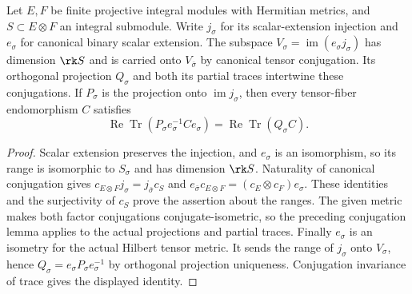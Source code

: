 \begin{lemma}
\label{lem:arithmetic-tensor-projection}
\leanok
Let $E,F$ be finite projective integral modules with Hermitian metrics,
and $S\subset E\otimes F$ an integral submodule. Write $j_\sigma$
for its scalar-extension injection and $e_\sigma$ for canonical binary
scalar extension. The subspace $V_\sigma=\operatorname{im}(e_\sigma j_\sigma)$
has dimension $\rk S$ and is carried onto $V_{\bar\sigma}$ by canonical
tensor conjugation. Its orthogonal projection $Q_\sigma$ and both its
partial traces intertwine these conjugations. If $P_\sigma$ is the
projection onto $\operatorname{im}j_\sigma$, then every tensor-fiber
endomorphism $C$ satisfies
\[
 \operatorname{Re}\operatorname{Tr}
  (P_\sigma e_\sigma^{-1}Ce_\sigma)
 =\operatorname{Re}\operatorname{Tr}(Q_\sigma C).
\]
\end{lemma}
\begin{proof}
Scalar extension preserves the injection, and $e_\sigma$ is an
isomorphism, so its range is isomorphic to $S_\sigma$ and has dimension
$\rk S$. Naturality of canonical conjugation gives
$c_{E\otimes F}j_\sigma=j_{\bar\sigma}c_S$ and
$e_{\bar\sigma}c_{E\otimes F}=(c_E\otimes c_F)e_\sigma$.
These identities and the surjectivity of $c_S$ prove the assertion about
the ranges. The given metric makes both factor conjugations
conjugate-isometric, so the preceding conjugation lemma applies to
the actual projections and partial traces.
Finally $e_\sigma$ is an isometry for the actual Hilbert tensor metric.
It sends the range of $j_\sigma$ onto $V_\sigma$, hence
$Q_\sigma=e_\sigma P_\sigma e_\sigma^{-1}$ by orthogonal projection
uniqueness. Conjugation invariance of trace gives the displayed identity.
\end{proof}

